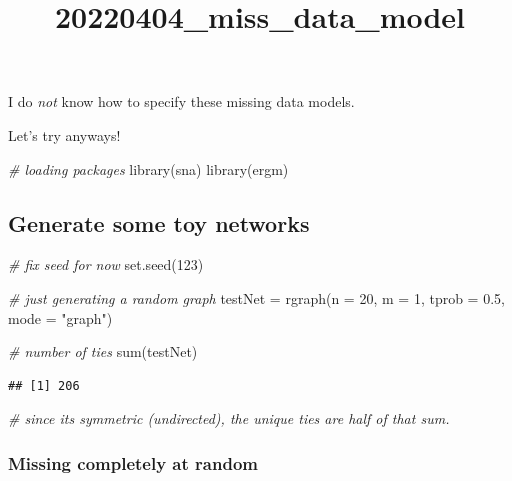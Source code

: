 \documentclass[
]{article}
\title{20220404\_miss\_data\_model}
\author{}
\date{\vspace{-2.5em}}
\newenvironment{Shaded}{\begin{snugshade}}{\end{snugshade}}
\newcommand{\AttributeTok}[1]{\textcolor[rgb]{0.77,0.63,0.00}{#1}}
\newcommand{\CommentTok}[1]{\textcolor[rgb]{0.56,0.35,0.01}{\textit{#1}}}
\newcommand{\DecValTok}[1]{\textcolor[rgb]{0.00,0.00,0.81}{#1}}
\newcommand{\FloatTok}[1]{\textcolor[rgb]{0.00,0.00,0.81}{#1}}
\newcommand{\FunctionTok}[1]{\textcolor[rgb]{0.00,0.00,0.00}{#1}}
\newcommand{\NormalTok}[1]{#1}
\newcommand{\OtherTok}[1]{\textcolor[rgb]{0.56,0.35,0.01}{#1}}
\newcommand{\StringTok}[1]{\textcolor[rgb]{0.31,0.60,0.02}{#1}}
\begin{document}
\maketitle

I do \emph{not} know how to specify these missing data models.

Let's try anyways!

\begin{Shaded}
\begin{Highlighting}[]
\CommentTok{\# loading packages}
\FunctionTok{library}\NormalTok{(sna)}
\FunctionTok{library}\NormalTok{(ergm)}
\end{Highlighting}
\end{Shaded}

\hypertarget{generate-some-toy-networks}{%
\subsection{Generate some toy
networks}\label{generate-some-toy-networks}}

\begin{Shaded}
\begin{Highlighting}[]
\CommentTok{\# fix seed for now}
\FunctionTok{set.seed}\NormalTok{(}\DecValTok{123}\NormalTok{)}

\CommentTok{\# just generating a random graph}
\NormalTok{testNet }\OtherTok{=} \FunctionTok{rgraph}\NormalTok{(}\AttributeTok{n =} \DecValTok{20}\NormalTok{,}
                   \AttributeTok{m =} \DecValTok{1}\NormalTok{,}
                   \AttributeTok{tprob =} \FloatTok{0.5}\NormalTok{,}
                   \AttributeTok{mode =} \StringTok{"graph"}\NormalTok{)}

\CommentTok{\# number of ties}
\FunctionTok{sum}\NormalTok{(testNet)}
\end{Highlighting}
\end{Shaded}

\begin{verbatim}
## [1] 206
\end{verbatim}

\begin{Shaded}
\begin{Highlighting}[]
\CommentTok{\# since it\textquotesingle{}s symmetric (undirected), the unique ties are half of that sum.}
\end{Highlighting}
\end{Shaded}

\hypertarget{missing-completely-at-random}{%
\subsubsection{Missing completely at
random}\label{missing-completely-at-random}}
\end{document}
